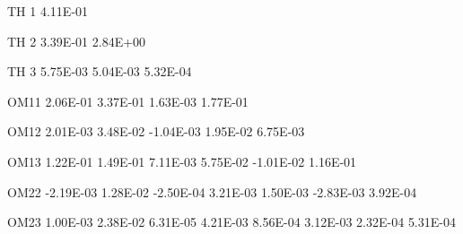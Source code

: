 \documentclass[
  11pt,
  krantz2, a4paper, twoside]{krantz}
\newenvironment{Shaded}{\begin{snugshade}}{\end{snugshade}}
\newcommand{\DecValTok}[1]{\textcolor[rgb]{0.00,0.00,0.81}{#1}}
\newcommand{\FloatTok}[1]{\textcolor[rgb]{0.00,0.00,0.81}{#1}}
\newcommand{\NormalTok}[1]{#1}
\theoremstyle{definition}
\theoremstyle{definition}
\theoremstyle{definition}
\theoremstyle{remark}
\begin{document}
\begin{Shaded}
\begin{Highlighting}[]
                                                                                                       
\NormalTok{TH }\DecValTok{1}    \FloatTok{4.11E{-}01}                                                                                       
                                                                                                       
\NormalTok{TH }\DecValTok{2}    \FloatTok{3.39E{-}01}  \FloatTok{2.84E+00}                                                                             
                                                                                                       
\NormalTok{TH }\DecValTok{3}    \FloatTok{5.75E{-}03}  \FloatTok{5.04E{-}03}  \FloatTok{5.32E{-}04}                                                                   
                                                                                                       
\NormalTok{OM11    }\FloatTok{2.06E{-}01}  \FloatTok{3.37E{-}01}  \FloatTok{1.63E{-}03}  \FloatTok{1.77E{-}01}                                                         
                                                                                                       
\NormalTok{OM12    }\FloatTok{2.01E{-}03}  \FloatTok{3.48E{-}02} \FloatTok{{-}1.04E{-}03}  \FloatTok{1.95E{-}02}  \FloatTok{6.75E{-}03}                                               
                                                                                                       
\NormalTok{OM13    }\FloatTok{1.22E{-}01}  \FloatTok{1.49E{-}01}  \FloatTok{7.11E{-}03}  \FloatTok{5.75E{-}02} \FloatTok{{-}1.01E{-}02}  \FloatTok{1.16E{-}01}                                     
                                                                                                       
\NormalTok{OM22   }\FloatTok{{-}2.19E{-}03}  \FloatTok{1.28E{-}02} \FloatTok{{-}2.50E{-}04}  \FloatTok{3.21E{-}03}  \FloatTok{1.50E{-}03} \FloatTok{{-}2.83E{-}03}  \FloatTok{3.92E{-}04}                           
                                                                                                       
\NormalTok{OM23    }\FloatTok{1.00E{-}03}  \FloatTok{2.38E{-}02}  \FloatTok{6.31E{-}05}  \FloatTok{4.21E{-}03}  \FloatTok{8.56E{-}04}  \FloatTok{3.12E{-}03}  \FloatTok{2.32E{-}04}  \FloatTok{5.31E{-}04}                 
                                                                                                       

\end{Highlighting}
\end{Shaded}
\end{document}
